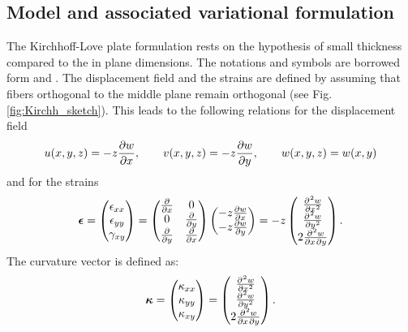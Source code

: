 \documentclass[preprint,12pt]{elsarticle}
\begin{document}
\subsection{Model and associated variational formulation}
\label{sec:VarKir}
The Kirchhoff-Love plate formulation rests on the hypothesis of small thickness compared to the in plane dimensions. The notations and symbols are borrowed form \cite{FEM_Cook} and \cite{Oslo}. The displacement field and the strains are defined by assuming that fibers orthogonal to the middle plane remain orthogonal (see Fig. \ref{fig:Kirchh_sketch}). This leads to the following relations for the displacement field
\begin{equation}
u(x,y,z) = -z \diffp{w}{x}, \qquad v(x,y,z) = -z \diffp{w}{y}, \qquad 
w(x,y,z) = w(x,y)
\end{equation}
and for the strains
\begin{equation}
\bm{\epsilon} =  
\begin{pmatrix}
\epsilon_{xx} \\
\epsilon_{yy} \\
\gamma_{xy} \\
\end{pmatrix}  = 
\begin{pmatrix}
\diffp{}{x} & 0 \\
0 & \diffp{}{y} \\
\diffp{}{y} & \diffp{}{x} \\
\end{pmatrix}
\begin{pmatrix}
-z \diffp{w}{x}\\
-z \diffp{w}{y}\\
\end{pmatrix} = 
-z
\begin{pmatrix}
\diffp[2]{w}{x} \\
\diffp[2]{w}{y} \\
2 \diffp{w}{x,y} \\
\end{pmatrix}. 
\end{equation}
The curvature vector is defined as:
\begin{equation}
\label{eq:CurVec}
\bm{\kappa} = 
\begin{pmatrix}
\kappa_{xx} \\
\kappa_{yy} \\
\kappa_{xy} \\
\end{pmatrix} = 
\begin{pmatrix}
\diffp[2]{w}{x} \\
\diffp[2]{w}{y} \\
2 \diffp{w}{x,y} \\
\end{pmatrix}.
\end{equation}
\end{document}
